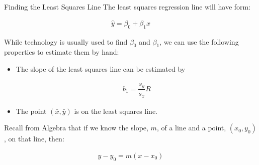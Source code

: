 \documentclass{beamer}
\begin{document}
\begin{frame}
  \begin{block}{Finding the Least Squares Line}
    The least squares regression line will have form:

    \vspace{-4mm}
    \begin{equation*}
      \begin{aligned}
        \hat{y} = \beta_{0} + \beta_{1} x
      \end{aligned}
    \end{equation*}\pause

    \vspace{-5mm}
    While technology is usually used to find $\beta_0$ and $\beta_1$, we can use the following properties to estimate them by hand:\pause
    \begin{itemize}
    \item The slope of the least squares line can be estimated by

      \vspace{-2mm}
      \begin{equation*}
        \begin{aligned}
          b_1 = \dfrac{s_y}{s_x} R
        \end{aligned}
      \end{equation*}\pause

      \vspace{-4mm}
      \item The point $(\bar{x},\bar{y})$ is on the least squares line.
    \end{itemize}
  \end{block}\pause

  \begin{note}
    Recall from Algebra that if we know the slope, $m$, of a line and a point, $(x_0,y_0)$, on that line, then:

    \vspace{-4mm}
    \begin{equation*}
      \begin{aligned}
        y-y_0=m(x-x_0)
      \end{aligned}
    \end{equation*}
  \end{note}
\end{frame}
\end{document}
